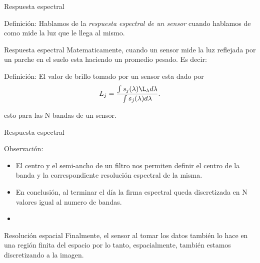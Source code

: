 \documentclass[handout]{beamer}
\begin{document}
\begin{frame}{Respuesta espectral}
  \begin{block}{Definición:}
    Hablamos de la \emph{respuesta espectral de un sensor} cuando hablamos de como mide la luz que le llega al mismo.
  \end{block}
\end{frame}

\begin{frame}{Respuesta espectral}
  Matematicamente, cuando un sensor mide la luz reflejada por un parche en el suelo esta haciendo un promedio pesado. Es decir:
  \begin{block}{Definición:}
    El valor de brillo tomado por un sensor esta dado por
    \begin{equation}
        L_{j} =\frac{\int s_j(\lambda) \L_\lambda d\lambda}{\int s_j(\lambda) d\lambda}.
    \end{equation}
  \end{block}
  esto para las N bandas de un sensor.
\end{frame}

\begin{frame}{Respuesta espectral}
  \begin{block}{Observación:}
  \begin{itemize}
  \item El centro y el semi-ancho de un filtro nos permiten definir el centro de la banda y la correspondiente resolución espectral de la misma.
  \item En conclusión, al terminar el día la firma espectral queda discretizada en N valores igual al numero de bandas.
  \item
  \end{itemize}
  \end{block}
\end{frame}

\begin{frame}{Resolución espacial}
  Finalmente, el sensor al tomar los datos también lo hace en una región finita del espacio por lo tanto, espacialmente, también estamos discretizando a la imagen.
\end{frame}
\end{document}
